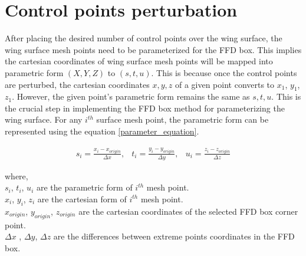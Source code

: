 \section{Control points perturbation}
After placing the desired number of control points over the wing surface, the wing surface mesh points need to be parameterized for the FFD box. This implies the cartesian coordinates of wing surface mesh points will be mapped into parametric form $(X, Y, Z)$ to $(s,t,u)$. This is because once the control points are perturbed, the cartesian coordinates $x,y,z$ of a given point converts to $x_1$, $y_1$, $z_1$. However, the given point's parametric form remains the same as $s,t,u$. This is the crucial step in implementing the FFD box method for parameterizing the wing surface. For any $i^{th}$ surface mesh point, the parametric form can be represented using the equation \ref{parameter_equation}.

\begin{equation}
\begin{array}{lll}
s_i = \frac{x_i - x_{origin}}{\Delta x}, & t_i = \frac{y_i - y_{origin}}{\Delta y}, & u_i = \frac{z_i - z_{origin}}{\Delta z} 
\end{array}
\label{parameter_equation}
\end{equation}

where,\\
$s_i$, $t_i$, $u_i$ are the parametric form of $i^{th}$ mesh point. \\
$x_i$, $y_i$, $z_i$ are the cartesian form of $i^{th}$ mesh point. \\
$x_{origin}$, $y_{origin}$, $z_{origin}$ are the cartesian coordinates of the selected FFD box corner point. \\
$\Delta x$ , $\Delta y$, $\Delta z$ are the differences between extreme points coordinates in the FFD box.\\

